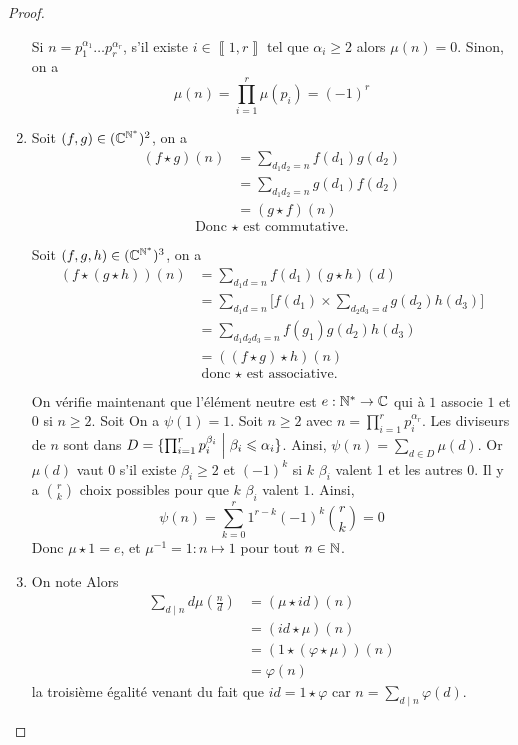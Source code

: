 \documentclass[12pt]{article}
\begin{document}
\begin{proof}
\begin{enumerate}
		Si $n=p_{1}^{\alpha_{1}}\dots p_{r}^{\alpha_{r}}$, s'il existe $i\in\left\llbracket 1,r\right\rrbracket$ tel que $\alpha_{i}\geqslant2$ alors $\mu(n)=0$. Sinon, on a 
		\begin{equation}
			\boxed{\mu(n)=\prod_{i=1}^{r}\mu(p_{i})=(-1)^{r}}
		\end{equation}

		\item Soit $(f,g)\in(\mathbb{C}^{\mathbb{N}^{*}})^{2}$, on a 
		\begin{align}
			(f\star g)(n)
			&=\sum_{d_{1}d_{2}=n}f(d_{1})g(d_{2})\\
			&=\sum_{d_{1}d_{2}=n}g(d_{1})f(d_{2})\\
			&=(g\star f)(n)
		\end{align}
		\begin{equation}
			\boxed{\text{Donc }\star\text{ est commutative.}}
		\end{equation}

		Soit $(f,g,h)\in(\mathbb{C}^{\mathbb{N}^{*}})^{3}$, on a 
		\begin{align}
			(f\star (g\star h))(n)
			&=\sum_{d_{1}d=n}f(d_{1})(g\star h)(d)\\
			&=\sum_{d_{1}d=n}\Biggl[f(d_{1})\times \sum_{d_{2}d_{3}=d}g(d_{2})h(d_{3})\Biggr]\\
			&=\sum_{d_{1}d_{2}d_{3}=n}f(g_{1})g(d_{2})h(d_{3})\\
			&=((f\star g)\star h)(n)
		\end{align}
		\begin{equation}
			\boxed{\text{donc }\star\text{ est associative. }}
		\end{equation}

		On vérifie maintenant que l'élément neutre est $e:\mathbb{N}^{*}\to\mathbb{C}$ qui à $1$ associe $1$ et 0 si $n\geqslant2$.
		Soit 
		On a $\psi(1)=1$. Soit $n\geqslant2$ avec $n=\prod_{i=1}^{r}p_{i}^{\alpha_{r}}$. Les diviseurs de $n$ sont dans $D=\{\prod_{i=1}^{r}p_{i}^{\beta_{i}}\Bigm| \beta_{i}\leqslant\alpha_{i}\}$. Ainsi, $\psi(n)=\sum_{d\in D}\mu(d)$. Or $\mu(d)$ vaut 0 s'il existe $\beta_{i}\geqslant2$ et $(-1)^{k}$ si $k$ $\beta_{i}$ valent 1 et les autres 0. Il y a $\binom{r}{k}$ choix possibles pour que $k$ $\beta_{i}$ valent $1$. Ainsi,
		\begin{equation}
			\psi(n)=\sum_{k=0}^{r}1^{r-k}(-1)^{k}\binom{r}{k}=0
		\end{equation}
		Donc $\mu\star 1=e$, et $\mu^{-1}=1\colon n\mapsto 1$ pour tout $n\in\mathbb{N}$.

		\item On note 
		Alors 
		\begin{align}
			\sum_{d\mid n}d\mu(\frac{n}{d})
			&=(\mu\star id)(n)\\
			&=(id\star \mu)(n)\\
			&=(1\star (\varphi\star \mu))(n)\\
			&=\boxed{\varphi(n)}
		\end{align}
		la troisième égalité venant du fait que $id=1\star\varphi$ car $n=\sum_{d\mid n}\varphi(d)$.
	\end{enumerate}
\end{proof}
\end{document}
